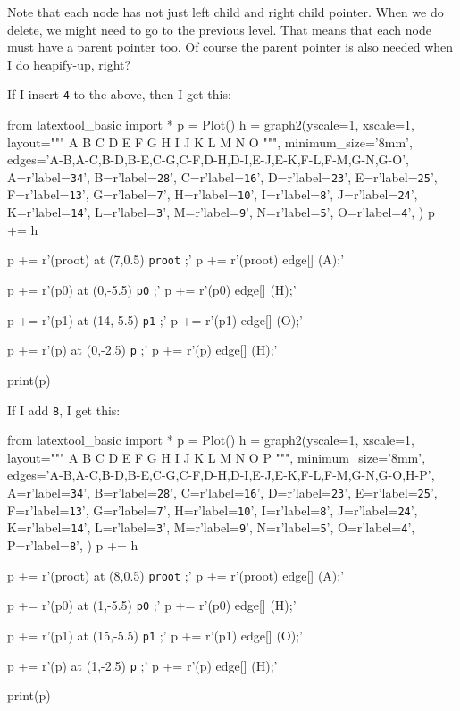 Note that each node has not just left child and right child pointer.
When we do delete, we might need to go to the previous level.
That means that each node must have a parent pointer too.
Of course the parent pointer is also needed when I do heapify-up, right?

If I insert \texttt{4} to the above, then I get this:

\begin{python}
from latextool_basic import *
p = Plot()
h = graph2(yscale=1, xscale=1,
layout="""
        A 
    B       C 
  D   E   F   G
 H I J K L M N O
""",
minimum_size='8mm',
edges='A-B,A-C,B-D,B-E,C-G,C-F,D-H,D-I,E-J,E-K,F-L,F-M,G-N,G-O',
A=r'label=\texttt{34}',
B=r'label=\texttt{28}',
C=r'label=\texttt{16}',
D=r'label=\texttt{23}',
E=r'label=\texttt{25}',
F=r'label=\texttt{13}',
G=r'label=\texttt{7}',
H=r'label=\texttt{10}',
I=r'label=\texttt{8}',
J=r'label=\texttt{24}',
K=r'label=\texttt{14}',
L=r'label=\texttt{3}',
M=r'label=\texttt{9}',
N=r'label=\texttt{5}',
O=r'label=\texttt{4}',
)
p += h

p += r'\node (proot) at (7,0.5) {\texttt{proot}} ;'
p += r'\path [-triangle 60] (proot) edge[] (A);'

p += r'\node (p0) at (0,-5.5) {\texttt{p0}} ;'
p += r'\path [-triangle 60] (p0) edge[] (H);'

p += r'\node (p1) at (14,-5.5) {\texttt{p1}} ;'
p += r'\path [-triangle 60] (p1) edge[] (O);'

p += r'\node (p) at (0,-2.5) {\texttt{p}} ;'
p += r'\path [-triangle 60] (p) edge[] (H);'

print(p)
\end{python}

If I add \texttt{8}, I get this:

\begin{python}
from latextool_basic import *
p = Plot()
h = graph2(yscale=1, xscale=1,
layout="""
        A 
    B       C 
  D   E   F   G
 H I J K L M N O
P
""",
minimum_size='8mm',
edges='A-B,A-C,B-D,B-E,C-G,C-F,D-H,D-I,E-J,E-K,F-L,F-M,G-N,G-O,H-P',
A=r'label=\texttt{34}',
B=r'label=\texttt{28}',
C=r'label=\texttt{16}',
D=r'label=\texttt{23}',
E=r'label=\texttt{25}',
F=r'label=\texttt{13}',
G=r'label=\texttt{7}',
H=r'label=\texttt{10}',
I=r'label=\texttt{8}',
J=r'label=\texttt{24}',
K=r'label=\texttt{14}',
L=r'label=\texttt{3}',
M=r'label=\texttt{9}',
N=r'label=\texttt{5}',
O=r'label=\texttt{4}',
P=r'label=\texttt{8}',
)
p += h

p += r'\node (proot) at (8,0.5) {\texttt{proot}} ;'
p += r'\path [-triangle 60] (proot) edge[] (A);'

p += r'\node (p0) at (1,-5.5) {\texttt{p0}} ;'
p += r'\path [-triangle 60] (p0) edge[] (H);'

p += r'\node (p1) at (15,-5.5) {\texttt{p1}} ;'
p += r'\path [-triangle 60] (p1) edge[] (O);'

p += r'\node (p) at (1,-2.5) {\texttt{p}} ;'
p += r'\path [-triangle 60] (p) edge[] (H);'

print(p)
\end{python}

